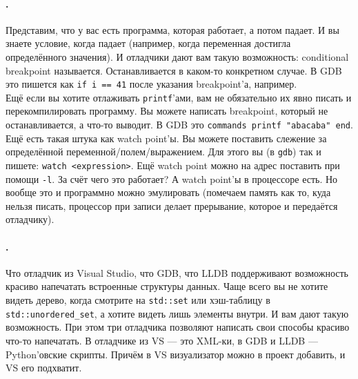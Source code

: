 \documentclass{article}
\begin{document}
    \paragraph{.}
    Представим, что у вас есть программа, которая работает, а потом падает. И вы знаете условие, когда падает (например, когда переменная достигла определённого значения). И отладчики дают вам такую возможность: conditional breakpoint называется. Останавливается в каком-то конкретном случае. В GDB это пишется как \texttt{if i == 41} после указания breakpoint'а, например.\\
    Ещё если вы хотите отлаживать \texttt{printf}'ами, вам не обязательно их явно писать и перекомпилировать программу. Вы можете написать breakpoint, который не останавливается, а что-то выводит. В GDB это \texttt{commands printf "abacaba" end}.\\
    Ещё есть такая штука как watch point'ы. Вы можете поставить слежение за определённой переменной/полем/выражением. Для этого вы (в \texttt{gdb}) так и пишете: \texttt{watch <expression>}. Ещё watch point можно на адрес поставить при помощи \texttt{-l}. За счёт чего это работает? А watch point'ы в процессоре есть. Но вообще это и программно можно эмулировать (помечаем память как то, куда нельзя писать, процессор при записи делает прерывание, которое и передаётся отладчику).
    \paragraph{.}
    Что отладчик из Visual Studio, что GDB, что LLDB поддерживают возможность красиво напечатать встроенные структуры данных. Чаще всего вы не хотите видеть дерево, когда смотрите на \texttt{std::set} или хэш-таблицу в \texttt{std::unordered_set}, а хотите видеть лишь элементы внутри. И вам дают такую возможность. При этом три отладчика позволяют написать свои способы красиво что-то напечатать. В отладчике из VS --- это XML-ки, в GDB и LLDB --- Python'овские скрипты. Причём в VS визуализатор можно в проект добавить, и VS его подхватит.
\end{document}
